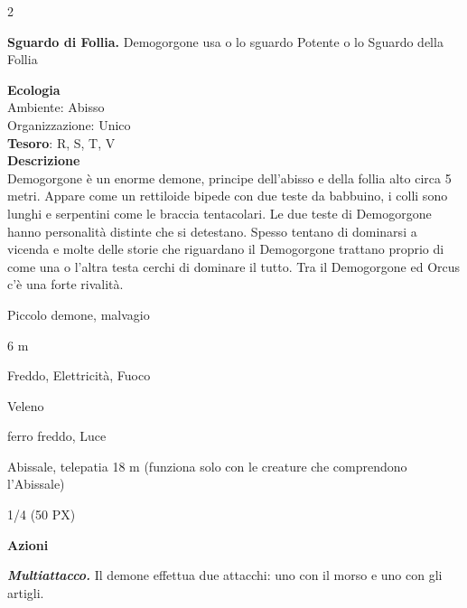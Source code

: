 \begin{multicols}{2}
{\textbf{Sguardo di Follia.} Demogorgone usa o lo sguardo Potente o lo Sguardo della Follia

\textbf{Ecologia}\\
Ambiente: Abisso\\
Organizzazione: Unico\\
\textbf{Tesoro}: R, S, T, V\\
\textbf{Descrizione}\\
Demogorgone è un enorme demone, principe dell'abisso e della follia alto circa 5 metri. Appare come un rettiloide bipede con due teste da babbuino, i colli sono lunghi e serpentini come le braccia tentacolari. Le due teste di Demogorgone hanno personalità distinte che si detestano. Spesso tentano di dominarsi a vicenda e molte delle storie che riguardano il Demogorgone trattano proprio di come una o l'altra testa cerchi di dominare il tutto. Tra il Demogorgone ed Orcus c'è una forte rivalità.



\begin{description}[noitemsep, topsep=0pt, parsep=0pt, partopsep=0pt, itemsep=1pt, leftmargin=2.35cm,  labelwidth=2.2cm, itemindent=0cm, listparindent=0pt] %
\setlength{\baselineskip}{10pt}
\item[\textbf{Taglia/Tipo}] Piccolo demone, malvagio
\item[\textbf{Caratt.}] 
\item[\textbf{Punti Ferita}] 
\item[\textbf{Movimento}] 6 m
\item[\textbf{Tiri Salvez.}] 
\item[\textbf{Res. Danni}] Freddo, Elettricità, Fuoco
\item[\textbf{Imm. Danni}] Veleno
\item[\textbf{Vulnerabilità}] ferro freddo, Luce
\item[\textbf{Sensi}] 
\item[\textbf{Linguaggi}] Abissale, telepatia 18 m (funziona solo con le creature che comprendono l'Abissale)
\item[\textbf{Sfida}] 1/4 (50 PX)
\end{description}
\smallskip

\textbf{Azioni}

\emph{\textbf{Multiattacco.}} Il demone effettua due attacchi: uno con il morso e uno con gli artigli.

}
\end{multicols}
